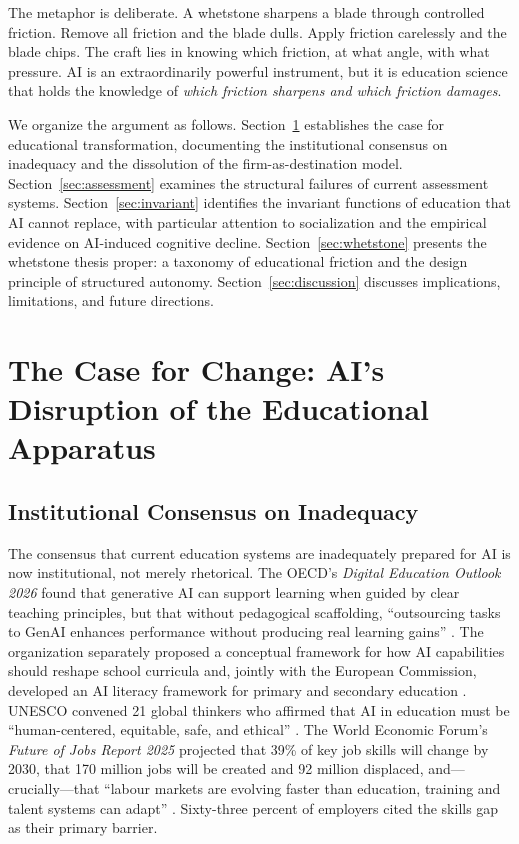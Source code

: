 \documentclass[12pt]{article}
\begin{document}
The metaphor is deliberate. A whetstone sharpens a blade through controlled friction. Remove all friction and the blade dulls. Apply friction carelessly and the blade chips. The craft lies in knowing which friction, at what angle, with what pressure. AI is an extraordinarily powerful instrument, but it is education science that holds the knowledge of \emph{which friction sharpens and which friction damages}.

We organize the argument as follows. Section~\ref{sec:case-for-change} establishes the case for educational transformation, documenting the institutional consensus on inadequacy and the dissolution of the firm-as-destination model. Section~\ref{sec:assessment} examines the structural failures of current assessment systems. Section~\ref{sec:invariant} identifies the invariant functions of education that AI cannot replace, with particular attention to socialization and the empirical evidence on AI-induced cognitive decline. Section~\ref{sec:whetstone} presents the whetstone thesis proper: a taxonomy of educational friction and the design principle of structured autonomy. Section~\ref{sec:discussion} discusses implications, limitations, and future directions.

\section{The Case for Change: AI's Disruption of the Educational Apparatus}
\label{sec:case-for-change}

\subsection{Institutional Consensus on Inadequacy}
\label{sec:consensus}

The consensus that current education systems are inadequately prepared for AI is now institutional, not merely rhetorical. The OECD's \emph{Digital Education Outlook 2026} found that generative AI can support learning when guided by clear teaching principles, but that without pedagogical scaffolding, ``outsourcing tasks to GenAI enhances performance without producing real learning gains'' \citep{OECD2026digital}. The organization separately proposed a conceptual framework for how AI capabilities should reshape school curricula \citep{OECD2025curriculum} and, jointly with the European Commission, developed an AI literacy framework for primary and secondary education \citep{OECD2025ailiteracy}. UNESCO convened 21 global thinkers who affirmed that AI in education must be ``human-centered, equitable, safe, and ethical'' \citep{UNESCO2025futures}. The World Economic Forum's \emph{Future of Jobs Report 2025} projected that 39\% of key job skills will change by 2030, that 170 million jobs will be created and 92 million displaced, and---crucially---that ``labour markets are evolving faster than education, training and talent systems can adapt'' \citep{WEF2025jobs}. Sixty-three percent of employers cited the skills gap as their primary barrier.
\end{document}
